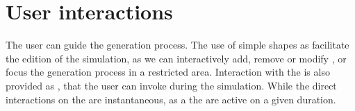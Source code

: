 



\section{User interactions}
\label{sec:env-obj_interaction}
The user can guide the generation process. The use of simple shapes as  facilitate the edition of the simulation, as we can interactively add, remove or modify , or focus the generation process in a restricted area. Interaction with the  is also provided as , that the user can invoke during the simulation. While the direct interactions on the  are instantaneous, as a the  are active on a given duration.

